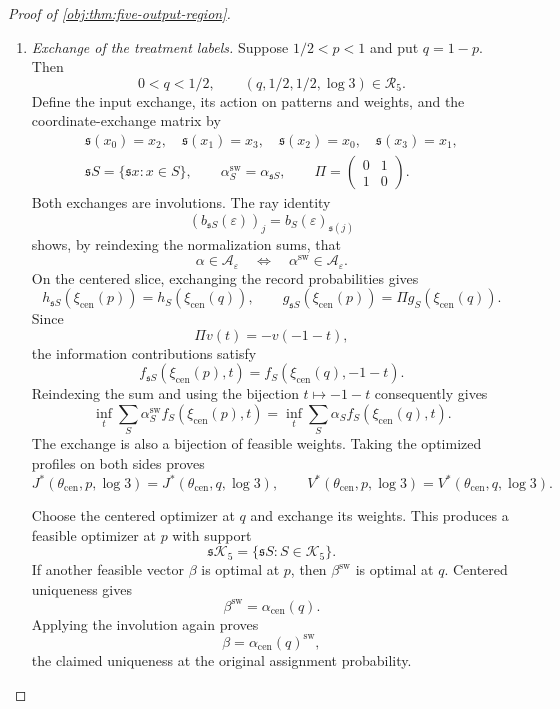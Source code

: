 \begin{proof}[Proof of \cref{obj:thm:five-output-region}]
\begin{enumerate}
\item \textit{Exchange of the treatment labels.}
Suppose \(1/2<p<1\) and put \(q=1-p\). Then
\[
0<q<1/2,
\qquad
(q,1/2,1/2,\log3)\in\mathcal R_5.
\]
Define the input exchange, its action on patterns and weights, and the
coordinate-exchange matrix by
\[
\begin{gathered}
\mathfrak s(x_0)=x_2,\quad
\mathfrak s(x_1)=x_3,\quad
\mathfrak s(x_2)=x_0,\quad
\mathfrak s(x_3)=x_1,\\
\mathfrak s S=\{\mathfrak s x:x\in S\},\qquad
\alpha^{\mathrm{sw}}_S=\alpha_{\mathfrak s S},\qquad
\Pi=\begin{pmatrix}0&1\\1&0\end{pmatrix}.
\end{gathered}
\]
Both exchanges are involutions. The ray identity
\[
(b_{\mathfrak s S}(\varepsilon))_j
=b_S(\varepsilon)_{\mathfrak s(j)}
\]
shows, by reindexing the normalization sums, that
\[
\alpha\in\mathcal A_\varepsilon
\quad\Longleftrightarrow\quad
\alpha^{\mathrm{sw}}\in\mathcal A_\varepsilon.
\]
On the centered slice, exchanging the record probabilities gives
\[
h_{\mathfrak s S}(\xi_{\mathrm{cen}}(p))
=h_S(\xi_{\mathrm{cen}}(q)),
\qquad
g_{\mathfrak s S}(\xi_{\mathrm{cen}}(p))
=\Pi g_S(\xi_{\mathrm{cen}}(q)).
\]
Since
\[
\Pi v(t)=-v(-1-t),
\]
the information contributions satisfy
\[
f_{\mathfrak s S}(\xi_{\mathrm{cen}}(p),t)
=
f_S(\xi_{\mathrm{cen}}(q),-1-t).
\]
Reindexing the sum and using the bijection \(t\mapsto-1-t\) consequently
gives
\[
\inf_t\sum_S\alpha^{\mathrm{sw}}_S
 f_S(\xi_{\mathrm{cen}}(p),t)
=
\inf_t\sum_S\alpha_S f_S(\xi_{\mathrm{cen}}(q),t).
\]
The exchange is also a bijection of feasible weights. Taking the
optimized profiles on both sides proves
\[
J^*(\theta_{\mathrm{cen}},p,\log3)
=
J^*(\theta_{\mathrm{cen}},q,\log3),
\qquad
V^*(\theta_{\mathrm{cen}},p,\log3)
=
V^*(\theta_{\mathrm{cen}},q,\log3).
\]

Choose the centered optimizer at \(q\) and exchange its weights. This
produces a feasible optimizer at \(p\) with support
\[
\mathfrak s\mathcal K_5=\{\mathfrak s S:S\in\mathcal K_5\}.
\]
If another feasible vector \(\beta\) is optimal at \(p\), then
\(\beta^{\mathrm{sw}}\) is optimal at \(q\). Centered uniqueness gives
\[
\beta^{\mathrm{sw}}=\alpha_{\mathrm{cen}}(q).
\]
Applying the involution again proves
\[
\beta=\alpha_{\mathrm{cen}}(q)^{\mathrm{sw}},
\]
the claimed uniqueness at the original assignment probability.


\end{enumerate}
\end{proof}
